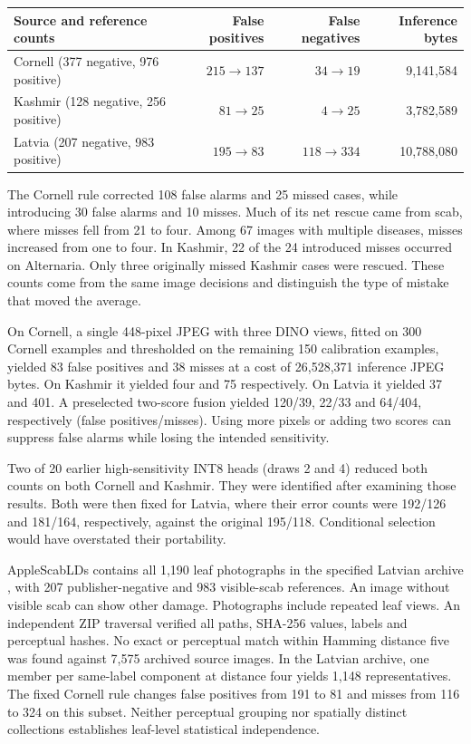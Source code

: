 \begin{center}\small
\begin{tabular}{@{}lrrr@{}}\toprule
Source and reference counts & False positives & False negatives & Inference bytes\\\midrule
Cornell (377 negative, 976 positive) &$215\to137$&$34\to19$&9,141,584\\
Kashmir (128 negative, 256 positive) &$81\to25$&$4\to25$&3,782,589\\
Latvia (207 negative, 983 positive) &$195\to83$&$118\to334$&10,788,080\\\bottomrule
\end{tabular}\end{center}

The Cornell rule corrected 108 false alarms and 25 missed cases, while introducing 30 false alarms and 10 misses. Much of its net rescue came from scab, where misses fell from 21 to four. Among 67 images with multiple diseases, misses increased from one to four. In Kashmir, 22 of the 24 introduced misses occurred on Alternaria. Only three originally missed Kashmir cases were rescued. These counts come from the same image decisions and distinguish the type of mistake that moved the average.

On Cornell, a single 448-pixel JPEG with three DINO views, fitted on 300 Cornell examples and thresholded on the remaining 150 calibration examples, yielded 83 false positives and 38 misses at a cost of 26,528,371 inference JPEG bytes. On Kashmir it yielded four and 75 respectively. On Latvia it yielded 37 and 401. A preselected two-score fusion yielded 120/39, 22/33 and 64/404, respectively (false positives/misses). Using more pixels or adding two scores can suppress false alarms while losing the intended sensitivity.

Two of 20 earlier high-sensitivity INT8 heads (draws 2 and 4) reduced both counts on both Cornell and Kashmir. They were identified after examining those results. Both were then fixed for Latvia, where their error counts were 192/126 and 181/164, respectively, against the original 195/118. Conditional selection would have overstated their portability.



\newpage
{}
AppleScabLDs contains all 1,190 leaf photographs in the specified Latvian archive \cite{kodors}, with 207 publisher-negative and 983 visible-scab references. An image without visible scab can show other damage. Photographs include repeated leaf views. An independent ZIP traversal verified all paths, SHA-256 values, labels and perceptual hashes. No exact or perceptual match within Hamming distance five was found against 7,575 archived source images. In the Latvian archive, one member per same-label component at distance four yields 1,148 representatives. The fixed Cornell rule changes false positives from 191 to 81 and misses from 116 to 324 on this subset. Neither perceptual grouping nor spatially distinct collections establishes leaf-level statistical independence.

